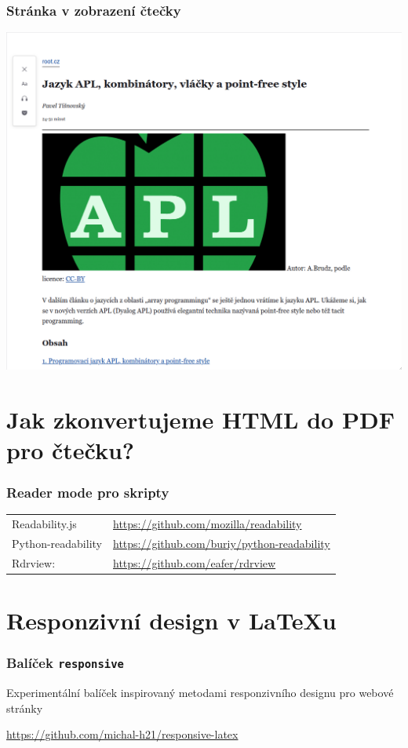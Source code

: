 \begin{frame}
  \frametitle{Stránka v zobrazení čtečky}
  \begin{center}
    \includegraphics[height=.9\textheight]{img/root-čtečka.png}
  \end{center}
\end{frame}

\section{Jak zkonvertujeme HTML do PDF pro čtečku?}

\begin{frame}
  \frametitle{Reader mode pro skripty}
  \begin{tabular}{ll}
    Readability.js & \url{https://github.com/mozilla/readability}\\
    Python-readability & \url{https://github.com/buriy/python-readability}\\
    Rdrview: &\url{https://github.com/eafer/rdrview}\\
  \end{tabular}

\end{frame}

\section{Responzivní design v \LaTeX u}

\begin{frame}
  \frametitle{Balíček \texttt{responsive}}

  Experimentální balíček inspirovaný metodami responzivního designu pro webové stránky

  \url{https://github.com/michal-h21/responsive-latex}
\end{frame}

